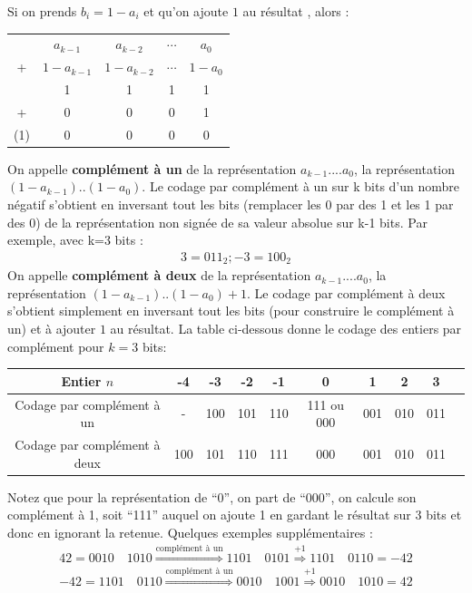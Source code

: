 Si on prends $b_i = 1-a_i$ et qu'on ajoute $1$ au résultat , alors :
\begin{center}
\begin{tabular}{ccccc}
  & $a_{k-1}$ & $a_{k-2}$ & $\cdots$ & $a_0$\\
+ & $1-a_{k-1}$ & $1-a_{k-2}$ & $\cdots$ & $1-a_0$ \\
\hline
  & 1        &  1       &  1       & 1\\
+ & 0        & 0        & 0        & 1\\
\hline
(1)& 0     & 0          &0          &0
\end{tabular}
\end{center}
On appelle \textbf{complément à un} de la représentation $a_{k-1}....a_0$, la représentation $(1-a_{k-1})..(1-a_0)$. Le codage par complément à un sur k bits d'un nombre négatif s'obtient en inversant tout les bits (remplacer les 0 par des 1 et les 1 par des 0) de la représentation non signée de sa valeur absolue sur k-1 bits. Par exemple, avec k=3 bits :
\begin{eqnarray*}
3 = 011_2 ; -3 = 100_2
\end{eqnarray*}
On appelle \textbf{complément à deux} de la représentation $a_{k-1}....a_0$, la représentation $(1-a_{k-1})..(1-a_0) + 1$. Le codage par complément à deux s'obtient simplement en inversant tout les bits (pour construire le complément à un) et à ajouter $1$ au résultat. La table ci-dessous donne le codage des entiers par complément pour $k=3$ bits:

\begin{center}
\begin{tabular}{c|c|c|c|c|c|c|c|c|c}
Entier $n$ & -4 & -3 & -2& -1 & 0 & 1 & 2 & 3 \\
\hline
Codage par complément à un & - & 100 & 101 & 110 & 111 ou 000 & 001 & 010 & 011\\
\hline
Codage par complément à deux & 100 & 101 & 110 & 111 & 000 & 001 & 010 & 011
\end{tabular}
\end{center}

Notez que pour la représentation de ``0'', on part de ``000'', on calcule son complément à 1, soit ``111'' auquel on ajoute 1 en gardant le résultat sur 3 bits et donc en ignorant la retenue. Quelques exemples supplémentaires :
\begin{eqnarray*}
42 = 0010\quad1010 \stackrel{\mbox{complément à un}}{\Rightarrow} 1101\quad0101  \stackrel{\mbox{+1}}{\Rightarrow} 1101\quad0110 = -42\\
-42 = 1101\quad0110\stackrel{\mbox{complément à un}}{\Rightarrow} 0010\quad1001  \stackrel{\mbox{+1}}{\Rightarrow} 0010\quad1010 = 42
\end{eqnarray*}

